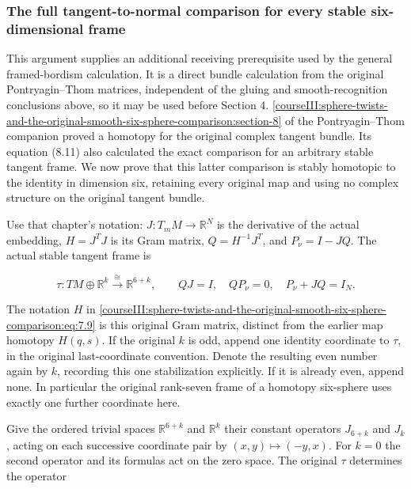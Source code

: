 \subsubsection{The full tangent-to-normal comparison for every stable six-dimensional frame}
\label{courseIII:sphere-twists-and-the-original-smooth-six-sphere-comparison:twist-general-stable-framing}

\label{courseIII:sphere-twists-and-the-original-smooth-six-sphere-comparison:section-7.1}

This argument supplies an additional receiving prerequisite used by the general framed-bordism calculation. It is a direct bundle calculation from the original Pontryagin--Thom matrices, independent of the gluing and smooth-recognition conclusions above, so it may be used before Section 4. \cref{courseIII:sphere-twists-and-the-original-smooth-six-sphere-comparison:section-8} of the Pontryagin--Thom companion proved a homotopy for the original complex tangent bundle. Its equation (8.11) also calculated the exact comparison for an arbitrary stable tangent frame. We now prove that this latter comparison is stably homotopic to the identity in dimension six, retaining every original map and using no complex structure on the original tangent bundle.

Use that chapter's notation: \(J:T_mM\to\mathbb R^N\) is the derivative of the actual embedding, \(H=J^TJ\) is its Gram matrix, \(Q=H^{-1}J^T\), and \(P_\nu=I-JQ\). The actual stable tangent frame is

\begin{equation}
\tau:T M\oplus\mathbb R^k\xrightarrow{\cong}\mathbb R^{6+k},
 \qquad QJ=I,\quad QP_\nu=0,\quad P_\nu+JQ=I_N .
 \label{courseIII:sphere-twists-and-the-original-smooth-six-sphere-comparison:eq:7.9}
\end{equation}

The notation \(H\) in \eqref{courseIII:sphere-twists-and-the-original-smooth-six-sphere-comparison:eq:7.9} is this original Gram matrix, distinct from the earlier map homotopy \(H(q,s)\). If the original \(k\) is odd, append one identity coordinate to \(\tau\), in the original last-coordinate convention. Denote the resulting even number again by \(k\), recording this one stabilization explicitly. If it is already even, append none. In particular the original rank-seven frame of a homotopy six-sphere uses exactly one further coordinate here.

Give the ordered trivial spaces \(\mathbb R^{6+k}\) and \(\mathbb R^k\) their constant operators \(J_{6+k}\) and \(J_k\), acting on each successive coordinate pair by \((x,y)\mapsto(-y,x)\). For \(k=0\) the second operator and its formulas act on the zero space. The original \(\tau\) determines the operator

